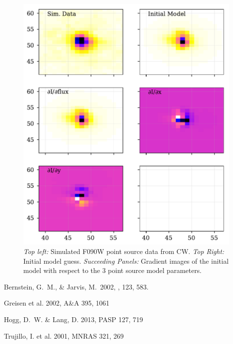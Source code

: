 \documentclass[modern]{aastex62}
\begin{document}
\begin{figure}
\includegraphics[width=\textwidth]{figures/demo_f090w_pointsource.pdf}
\caption{{\it Top left: } Simulated F090W point source data from CW.  
{\it Top Right:} Initial model guess.  
{\it Succeeding Panels:} Gradient images of the initial model with respect to the 3 point source model parameters.
\label{fig:f090w}}
\end{figure}



\begin{thebibliography}{}\raggedright
{}
Bernstein, G.~M., \& Jarvis, M.\ 2002, \aj, 123, 583.

Greisen et al. 2002, A\&A 395, 1061

Hogg, D.~W. \& Lang, D. 2013, PASP 127, 719

Trujillo, I. et al. 2001, MNRAS 321, 269


\end{thebibliography}
\end{document}
